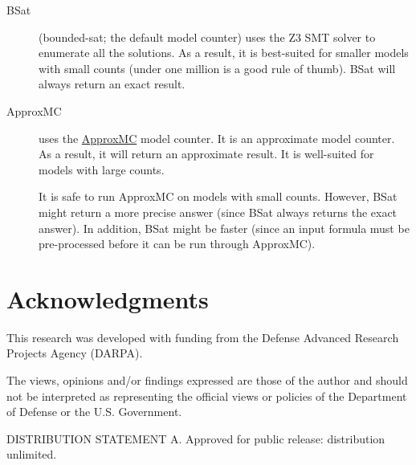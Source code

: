 \documentclass[11pt]{article}
\begin{document}
\begin{description}
    \item[BSat] (bounded-sat; the default model counter) uses the Z3 SMT solver to enumerate all the solutions. As a result, it is best-suited for smaller models with small counts (under one million is a good rule of thumb). BSat will always return an exact result.
    \item[ApproxMC] uses the \href{https://github.com/meelgroup/approxmc}{ApproxMC} model counter. It is an approximate model counter. As a result, it will return an approximate result. It is well-suited for models with large counts.
    
    It is safe to run ApproxMC on models with small counts. However, BSat might return a more precise answer (since BSat always returns the exact answer). In addition, BSat might be faster (since an input formula must be pre-processed before it can be run through ApproxMC).
\end{description}

\section{Acknowledgments}
This research was developed with funding from the Defense Advanced Research Projects Agency (DARPA).

The views, opinions and/or findings expressed are those of the author and should not be interpreted as representing the official views or policies of the Department of Defense or the U.S. Government.

DISTRIBUTION STATEMENT A. Approved for public release: distribution unlimited.
\end{document}
